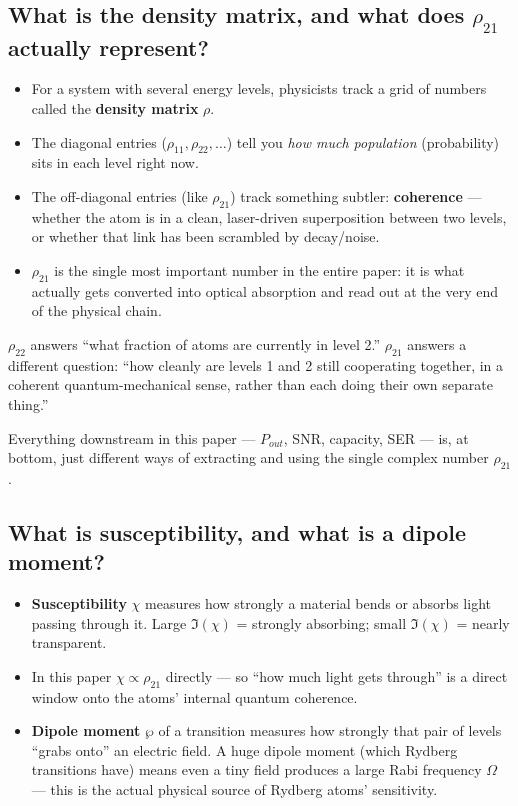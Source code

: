 \documentclass[11pt]{article}
\begin{document}
\subsection*{What is the density matrix, and what does $\rho_{21}$ actually represent?}
\begin{itemize}
\item For a system with several energy levels, physicists track a grid of numbers called the \textbf{density matrix} $\rho$.
\item The diagonal entries ($\rho_{11},\rho_{22},\dots$) tell you \emph{how much population} (probability) sits in each level right now.
\item The off-diagonal entries (like $\rho_{21}$) track something subtler: \textbf{coherence} --- whether the atom is in a clean, laser-driven superposition between two levels, or whether that link has been scrambled by decay/noise.
\item $\rho_{21}$ is the single most important number in the entire paper: it is what actually gets converted into optical absorption and read out at the very end of the physical chain.
\end{itemize}
\begin{plain}
$\rho_{22}$ answers ``what fraction of atoms are currently in level 2.'' $\rho_{21}$ answers a different question: ``how cleanly are levels 1 and 2 still cooperating together, in a coherent quantum-mechanical sense, rather than each doing their own separate thing.''
\end{plain}
\begin{takeaway}
Everything downstream in this paper --- $P_{out}$, SNR, capacity, SER --- is, at bottom, just different ways of extracting and using the single complex number $\rho_{21}$.
\end{takeaway}

\subsection*{What is susceptibility, and what is a dipole moment?}
\begin{itemize}
\item \textbf{Susceptibility} $\chi$ measures how strongly a material bends or absorbs light passing through it. Large $\Im(\chi)$ = strongly absorbing; small $\Im(\chi)$ = nearly transparent.
\item In this paper $\chi \propto \rho_{21}$ directly --- so ``how much light gets through'' is a direct window onto the atoms' internal quantum coherence.
\item \textbf{Dipole moment} $\wp$ of a transition measures how strongly that pair of levels ``grabs onto'' an electric field. A huge dipole moment (which Rydberg transitions have) means even a tiny field produces a large Rabi frequency $\Omega$ --- this is the actual physical source of Rydberg atoms' sensitivity.
\end{itemize}
\end{document}
